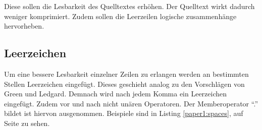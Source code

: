 Diese sollen die Lesbarkeit des Quelltextes erhöhen. Der Quelltext wirkt dadurch weniger komprimiert. Zudem sollen die Leerzeilen logische zusammenhänge hervorheben.

\subsection{Leerzeichen}

Um eine bessere Lesbarkeit einzelner Zeilen zu erlangen werden an bestimmten Stellen Leerzeichen eingefügt. Dieses geschieht analog zu den Vorschlägen von Green und Ledgard\cite[S. 7]{Green}. Demnach wird nach jedem Komma ein Leerzeichen eingefügt. Zudem vor und nach nicht unären Operatoren. Der Memberoperator \enquote{.} bildet ist hiervon ausgenommen. Beispiele sind in Listing \ref{paper1:spaces}, auf Seite \pageref{paper1:spaces} zu sehen.


